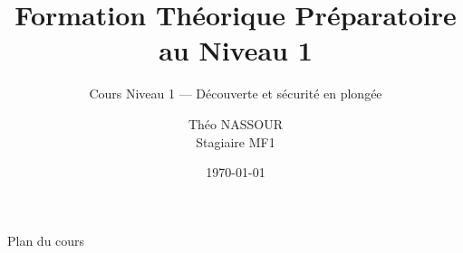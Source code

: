 \documentclass[aspectratio=169]{beamer}
\title[Formation théorique N1]{Formation Théorique Préparatoire au Niveau 1}
\subtitle{Cours Niveau 1 — Découverte et sécurité en plongée}
\author[Théo NASSOUR]{Théo NASSOUR\\\small Stagiaire MF1}
\institute[CST]{CST — Club Subaquatique Thiernois}
\date[]{\today}
\begin{document}
{
  \begin{frame}
    \titlepage
  \end{frame}
}

{
  \begin{frame}{Plan du cours}
    \tableofcontents
  \end{frame}
}














\end{document}
